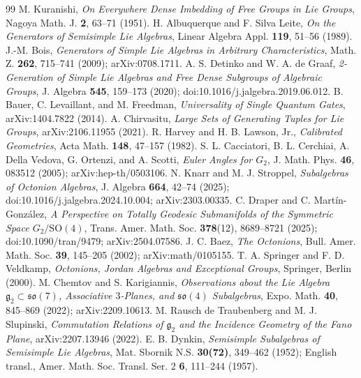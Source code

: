 \documentclass[11pt,a4paper]{article}
\newcommand{\SO}{\mathrm{SO}}
\begin{document}
\begin{thebibliography}{99}\small
{} M. Kuranishi, \textit{On Everywhere Dense Imbedding of Free Groups in Lie Groups}, Nagoya Math. J. \textbf{2}, 63--71 (1951).
 H. Albuquerque and F. Silva Leite, \textit{On the Generators of Semisimple Lie Algebras}, Linear Algebra Appl. \textbf{119}, 51--56 (1989).
 J.-M. Bois, \textit{Generators of Simple Lie Algebras in Arbitrary Characteristics}, Math. Z. \textbf{262}, 715--741 (2009); arXiv:0708.1711.
 A. S. Detinko and W. A. de Graaf, \textit{2-Generation of Simple Lie Algebras and Free Dense Subgroups of Algebraic Groups}, J. Algebra \textbf{545}, 159--173 (2020); doi:10.1016/j.jalgebra.2019.06.012.
 B. Bauer, C. Levaillant, and M. Freedman, \textit{Universality of Single Quantum Gates}, arXiv:1404.7822 (2014).
 A. Chirvasitu, \textit{Large Sets of Generating Tuples for Lie Groups}, arXiv:2106.11955 (2021).
 R. Harvey and H. B. Lawson, Jr., \textit{Calibrated Geometries}, Acta Math. \textbf{148}, 47--157 (1982).
 S. L. Cacciatori, B. L. Cerchiai, A. Della Vedova, G. Ortenzi, and A. Scotti, \textit{Euler Angles for $G_2$}, J. Math. Phys. \textbf{46}, 083512 (2005); arXiv:hep-th/0503106.
 N. Knarr and M. J. Stroppel, \textit{Subalgebras of Octonion Algebras}, J. Algebra \textbf{664}, 42--74 (2025); doi:10.1016/j.jalgebra.2024.10.004; arXiv:2303.00335.
 C. Draper and C. Mart\'in-Gonz\'alez, \textit{A Perspective on Totally Geodesic Submanifolds of the Symmetric Space $G_2/\SO(4)$}, Trans. Amer. Math. Soc. \textbf{378}(12), 8689--8721 (2025); doi:10.1090/tran/9479; arXiv:2504.07586.
 J. C. Baez, \textit{The Octonions}, Bull. Amer. Math. Soc. \textbf{39}, 145--205 (2002); arXiv:math/0105155.
 T. A. Springer and F. D. Veldkamp, \textit{Octonions, Jordan Algebras and Exceptional Groups}, Springer, Berlin (2000).
 M. Chemtov and S. Karigiannis, \textit{Observations about the Lie Algebra $\mathfrak g_2\subset\mathfrak{so}(7)$, Associative $3$-Planes, and $\mathfrak{so}(4)$ Subalgebras}, Expo. Math. \textbf{40}, 845--869 (2022); arXiv:2209.10613.
 M. Rausch de Traubenberg and M. J. Slupinski, \textit{Commutation Relations of $\mathfrak g_2$ and the Incidence Geometry of the Fano Plane}, arXiv:2207.13946 (2022).
 E. B. Dynkin, \textit{Semisimple Subalgebras of Semisimple Lie Algebras}, Mat. Sbornik N.S. \textbf{30(72)}, 349--462 (1952); English transl., Amer. Math. Soc. Transl. Ser. 2 \textbf{6}, 111--244 (1957).

\end{thebibliography}
\end{document}
